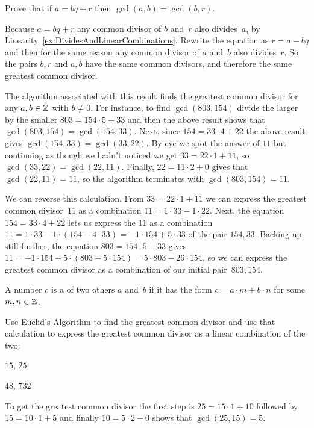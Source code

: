 \documentclass{ibl}  %
\begin{document}
\begin{bezoutproof}
\begin{ex}
Prove that if $a=bq+r$ then $\gcd(a,b)=\gcd(b,r)$.  
\begin{ans}
Because $a=bq+r$ any common divisor of $b$ and~$r$ also divides~$a$, 
by Linearity~\ref{ex:DividesAndLinearCombinations}.
Rewrite the equation as $r=a-bq$ and then for the same reason any
common divisor of $a$ and~$b$ also divides~$r$.
So the pairs $b,r$ and $a,b$ have the same common divisors, and
therefore the same greatest common divisor.
\end{ans}
\end{ex}

The algorithm associated with this result finds the greatest common
divisor for any $a,b\in\mathbb{Z}$ with $b\neq 0$.  
For instance, to find $\gcd(803,154)$ divide the larger by
the smaller $803=154\cdot 5+33$ and then the above result shows that  
$\gcd(803,154)=\gcd(154,33)$.
Next, since $154=33\cdot 4+22$ the above result gives
$\gcd(154,33)=\gcd(33,22)$.
By eye we spot the answer of $11$ but continuing as though we hadn't noticed
we get $33=22\cdot 1+11$, so $\gcd(33,22)=\gcd(22,11)$.
Finally, $22=11\cdot 2+0$ gives that 
$\gcd(22,11)=11$, so the algorithm terminates with $\gcd(803,154)=11$.

We can reverse this calculation.
From $33=22\cdot 1+11$ we can  
express the greatest common divisor~$11$ as a combination 
$11=1\cdot 33-1\cdot 22$.
Next, 
the equation $154=33\cdot 4+22$ lets us express
the $11$ as a combination 
$11=1\cdot 33-1\cdot (154-4\cdot 33)=-1\cdot 154+5\cdot 33$
of the pair $154,33$.
Backing up still further, the equation 
$803=154\cdot 5+33$
gives $11=-1\cdot 154+5\cdot (803-5\cdot 154)=5\cdot 803-26\cdot 154$, so 
we can express the greatest common divisor as a combination of our
initial pair~$803,154$.


\begin{df}
A number $c$ is a  of two others $a$ and~$b$
if it has the form $c=a\cdot m+b\cdot n$ for some $m,n\in\mathbb{Z}$.  
\end{df}

\begin{ex}
Use Euclid's Algorithm to find the greatest common divisor and 
use that calculation to express the greatest common divisor as a 
linear combination of the two:
\begin{items}
\item $15$, $25$
\item $48$, $732$
\end{items}
\begin{ans}
\begin{items}
\item To get the greatest common divisor the first step is
  $25=15\cdot 1+10$ followed by $15=10\cdot 1+5$ and finally
  $10=5\cdot 2+0$ shows that $\gcd(25,15)=5$.


\end{items}
\end{ans}
\end{ex}
\end{bezoutproof}
\end{document}
